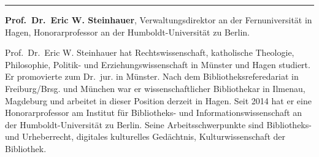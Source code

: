 \documentclass[a4paper,
fontsize=11pt,
oneside,
numbers=noperiodatend,
parskip=half-,
bibliography=totoc,
final
]{scrartcl}
\begin{document}
\begin{center}\rule{0.5\linewidth}{\linethickness}\end{center}

\textbf{Prof.~Dr.~Eric W. Steinhauer}, Verwaltungsdirektor an der
Fernuniversität in Hagen, Honorarprofessor an der Humboldt-Universität
zu Berlin.

Prof.~Dr.~Eric W. Steinhauer hat Rechtswissenschaft, katholische
Theologie, Philosophie, Politik- und Erziehungswissenschaft in Münster
und Hagen studiert. Er promovierte zum Dr.~jur. in Münster. Nach dem
Bibliotheksreferedariat in Freiburg/Brsg. und München war er
wissenschaftlicher Bibliothekar in Ilmenau, Magdeburg und arbeitet in
dieser Position derzeit in Hagen. Seit 2014 hat er eine Honorarprofessor
am Institut für Bibliotheks- und Informationswissenschaft an der
Humboldt-Universität zu Berlin. Seine Arbeitsschwerpunkte sind
Bibliotheks- und Urheberrecht, digitales kulturelles Gedächtnis,
Kulturwissenschaft der Bibliothek.
\end{document}
